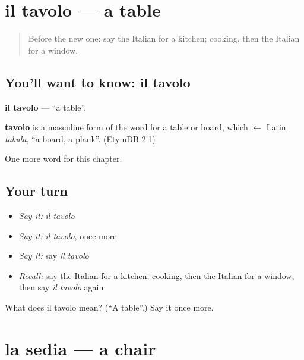 \section[il tavolo]{il tavolo — a table}

\label{lesson:IT-C56-tavolo}



\begin{quote}
Before the new one: say the Italian for a kitchen; cooking, then the Italian for a window.
\end{quote}

\subsection*{You'll want to know: il tavolo}
\textbf{il tavolo} — \textquotedblleft{}a table\textquotedblright{}.

\begin{cousinweb}
\textbf{tavolo} is a masculine form of the word for a table or board, which $\leftarrow$ Latin \emph{tabula}, \textquotedblleft{}a board, a plank\textquotedblright{}. (EtymDB 2.1)
\end{cousinweb}

\begin{grammarlens}[title={What you've built}]
One more word for this chapter.
\end{grammarlens}

\subsection*{Your turn}
\begin{itemize}
\raggedright
  \item \emph{Say it:} \emph{il tavolo}
  \item \emph{Say it:} \emph{il tavolo}, once more
  \item \emph{Say it:} say \emph{il tavolo}
  \item \emph{Recall:} say the Italian for a kitchen; cooking, then the Italian for a window, then say \emph{il tavolo} again
\end{itemize}

\begin{tcolorbox}[breakable,colback=teal!4,colframe=teal!35!black,title={Before you move on}]
What does il tavolo mean? (\textquotedblleft{}A table\textquotedblright{}.) Say it once more.
\end{tcolorbox}
\section[la sedia]{la sedia — a chair}


